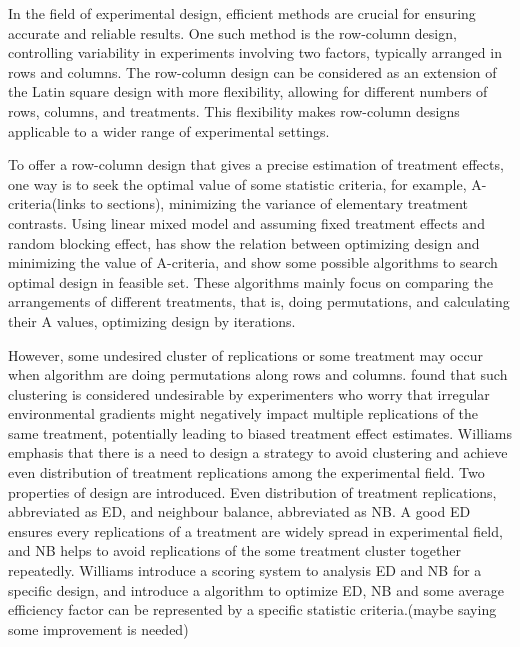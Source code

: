 \documentclass[
  a4paper,
  oneside,
  openany,
  12pt,
  onecolumn]{book}
\theoremstyle{definition}
\theoremstyle{plain}
\theoremstyle{remark}
\begin{document}
In the field of experimental design, efficient methods are crucial for
ensuring accurate and reliable results. One such method is the
row-column design, controlling variability in experiments involving two
factors, typically arranged in rows and columns. The row-column design
can be considered as an extension of the Latin square design with more
flexibility, allowing for different numbers of rows, columns, and
treatments. This flexibility makes row-column designs applicable to a
wider range of experimental settings.

To offer a row-column design that gives a precise estimation of
treatment effects, one way is to seek the optimal value of some
statistic criteria, for example, A-criteria(links to sections),
minimizing the variance of elementary treatment contrasts. Using linear
mixed model and assuming fixed treatment effects and random blocking
effect, \citet{butler2013optimal} has show the relation between
optimizing design and minimizing the value of A-criteria, and show some
possible algorithms to search optimal design in feasible set. These
algorithms mainly focus on comparing the arrangements of different
treatments, that is, doing permutations, and calculating their A values,
optimizing design by iterations.

However, some undesired cluster of replications or some treatment may
occur when algorithm are doing permutations along rows and columns.
\citet{piepho2018neighbor} found that such clustering is considered
undesirable by experimenters who worry that irregular environmental
gradients might negatively impact multiple replications of the same
treatment, potentially leading to biased treatment effect estimates.
Williams emphasis that there is a need to design a strategy to avoid
clustering and achieve even distribution of treatment replications among
the experimental field. Two properties of design are introduced. Even
distribution of treatment replications, abbreviated as ED, and neighbour
balance, abbreviated as NB. A good ED ensures every replications of a
treatment are widely spread in experimental field, and NB helps to avoid
replications of the some treatment cluster together repeatedly. Williams
introduce a scoring system to analysis ED and NB for a specific design,
and introduce a algorithm to optimize ED, NB and some average efficiency
factor can be represented by a specific statistic criteria.(maybe saying
some improvement is needed)
\end{document}
